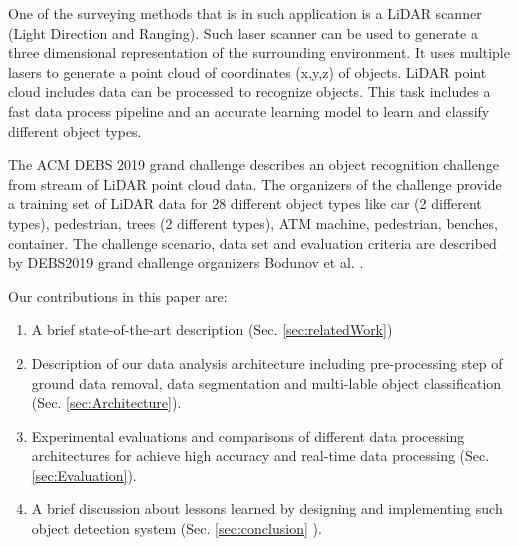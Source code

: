 \documentclass[sigconf]{acmart}
\begin{document}
One of the surveying methods that is in such application is a LiDAR scanner (Light Direction and Ranging). Such laser scanner can be used to generate a three dimensional representation of the surrounding environment. 
It uses multiple lasers to generate a point cloud of coordinates (x,y,z) of objects. 
LiDAR point cloud includes data can be processed to recognize objects. This task includes a fast data process pipeline and an accurate learning model to learn and classify different object types. 

The ACM DEBS 2019 grand challenge \cite{DEBSGC2019} describes an object recognition challenge from stream of LiDAR point cloud data. 
The organizers of the challenge provide a training set of LiDAR data for 28 different object types like car (2 different types), pedestrian, trees (2 different types), ATM machine, pedestrian, benches, container. The challenge scenario, data set and evaluation criteria are described by DEBS2019 grand challenge organizers  Bodunov et al. \cite{DEBSGC2019}. 


Our contributions in this paper are: 


\begin{enumerate}
  \item A brief state-of-the-art description (Sec. \ref{sec:relatedWork})
  \item Description of our data analysis architecture including pre-processing step of ground data removal, data segmentation 
  and multi-lable object classification  (Sec.  \ref{sec:Architecture}).
  \item Experimental evaluations and comparisons of different data processing architectures for achieve high accuracy 
  and real-time data processing (Sec. \ref{sec:Evaluation}).  
  \item A brief discussion about lessons learned by designing and implementing such object detection system  (Sec. \ref{sec:conclusion} ). 
\end{enumerate}    

  



  




















\end{document}
